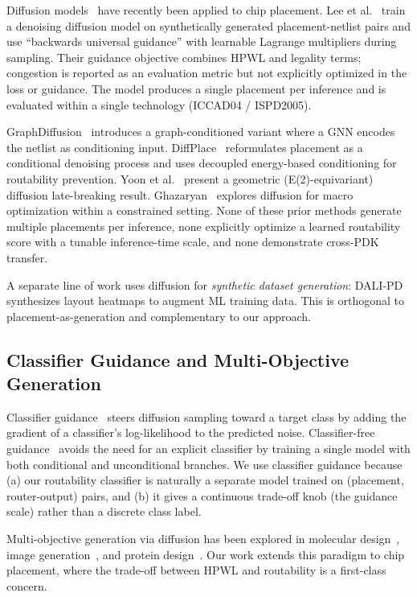 Diffusion models~\cite{sohl2015deep, ho2020ddpm} have recently been applied to chip placement. Lee et al.~\cite{lee2024chipdiffusion} train a denoising diffusion model on synthetically generated placement-netlist pairs and use ``backwards universal guidance'' with learnable Lagrange multipliers during sampling. Their guidance objective combines HPWL and legality terms; congestion is reported as an evaluation metric but not explicitly optimized in the loss or guidance. The model produces a single placement per inference and is evaluated within a single technology (ICCAD04 / ISPD2005).

GraphDiffusion~\cite{fang2025graphdiffusion} introduces a graph-conditioned variant where a GNN encodes the netlist as conditioning input. DiffPlace~\cite{trung2025diffplace} reformulates placement as a conditional denoising process and uses decoupled energy-based conditioning for routability prevention. Yoon et al.~\cite{yoon2025geometric} present a geometric (E(2)-equivariant) diffusion late-breaking result. Ghazaryan~\cite{ghazaryan2025macro} explores diffusion for macro optimization within a constrained setting. None of these prior methods generate multiple placements per inference, none explicitly optimize a learned routability score with a tunable inference-time scale, and none demonstrate cross-PDK transfer.

A separate line of work uses diffusion for \emph{synthetic dataset generation}: DALI-PD~\cite{wu2025dalipd} synthesizes layout heatmaps to augment ML training data. This is orthogonal to placement-as-generation and complementary to our approach.

\subsection{Classifier Guidance and Multi-Objective Generation}

Classifier guidance~\cite{dhariwal2021guidance} steers diffusion sampling toward a target class by adding the gradient of a classifier's log-likelihood to the predicted noise. Classifier-free guidance~\cite{ho2021classifier-free} avoids the need for an explicit classifier by training a single model with both conditional and unconditional branches. We use classifier guidance because (a) our routability classifier is naturally a separate model trained on (placement, router-output) pairs, and (b) it gives a continuous trade-off knob (the guidance scale) rather than a discrete class label.

Multi-objective generation via diffusion has been explored in molecular design~\cite{guan2023multiobj}, image generation~\cite{liu2023more}, and protein design~\cite{watson2023rfdiff}. Our work extends this paradigm to chip placement, where the trade-off between HPWL and routability is a first-class concern.

